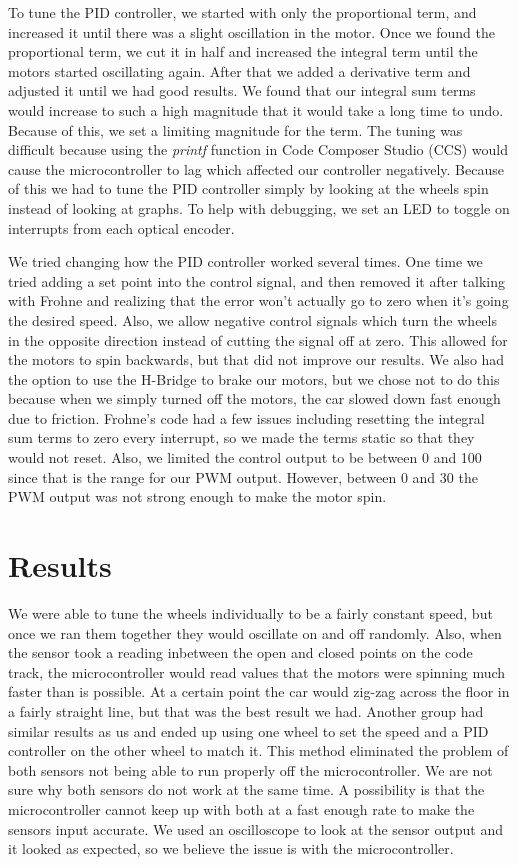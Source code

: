 \documentclass{article}
\begin{document}
To tune the PID controller, we started with only the proportional term, and increased it until there was a slight oscillation in the motor. Once we found the proportional term, we cut it in half and increased the integral term until the motors started oscillating again. After that we added a derivative term and adjusted it until we had good results. We found that our integral sum terms would increase to such a high magnitude that it would take a long time to undo. Because of this, we set a limiting magnitude for the term. The tuning was difficult because using the \textit{printf} function in Code Composer Studio (CCS) would cause the microcontroller to lag which affected our controller negatively. Because of this we had to tune the PID controller simply by looking at the wheels spin instead of looking at graphs. To help with debugging, we set an LED to toggle on interrupts from each optical encoder.

We tried changing how the PID controller worked several times. One time we tried adding a set point into the control signal, and then removed it after talking with Frohne and realizing that the error won't actually go to zero when it's going the desired speed. Also, we allow negative control signals which turn the wheels in the opposite direction instead of cutting the signal off at zero. This allowed for the motors to spin backwards, but that did not improve our results. We also had the option to use the H-Bridge to brake our motors, but we chose not to do this because when we simply turned off the motors, the car slowed down fast enough due to friction. Frohne's code had a few issues including resetting the integral sum terms to zero every interrupt, so we made the terms static so that they would not reset. Also, we limited the control output to be between 0 and 100 since that is the range for our PWM output. However, between 0 and 30 the PWM output was not strong enough to make the motor spin.

\section{Results}
We were able to tune the wheels individually to be a fairly constant speed, but once we ran them together they would oscillate on and off randomly. Also, when the sensor took a reading inbetween the open and closed points on the code track, the microcontroller would read values that the motors were spinning much faster than is possible. At a certain point the car would zig-zag across the floor in a fairly straight line, but that was the best result we had. Another group had similar results as us and ended up using one wheel to set the speed and a PID controller on the other wheel to match it. This method eliminated the problem of both sensors not being able to run properly off the microcontroller. We are not sure why both sensors do not work at the same time. A possibility is that the microcontroller cannot keep up with both at a fast enough rate to make the sensors input accurate. We used an oscilloscope to look at the sensor output and it looked as expected, so we believe the issue is with the microcontroller.
\end{document}
